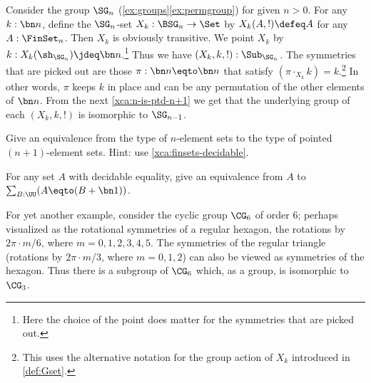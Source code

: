 \begin{example}
  \label{exa:fix1subSGn}%
Consider the group $\SG_n$ (\cref{ex:groups}\ref{ex:permgroup}) 
for given $n>0$. For any $k:\bn n$, define
the $\SG_n$-set $X_k : \BSG_n  \to\Set$ by $X_k(A,!)\defeq A$ for any
$A:\FinSet_n$. Then $X_k$ is obviously transitive. We point $X_k$ by
$k: X_k(\sh_{\SG_n}) \jdeq \bn n$.\footnote{Here the choice of the point
does matter for the symmetries that are picked out.}
Thus we have $(X_k,k,!):\Sub_{\SG_n}$.
The symmetries that are picked out are those $\pi : \bn n \eqto \bn n$
that satisfy $(\pi \cdot_{X_k}k) = k$.\footnote{%
This uses the alternative notation for the group action of $X_k$
introduced in \cref{def:Gset}.}
In other words, $\pi$ keeps $k$ in place and can be any permutation
of the other elements of $\bn n$. From the next \cref{xca:n-is-ptd-n+1}
we get that the underlying group of each $(X_k,k,!)$ 
is isomorphic to $\SG_{n-1}$.
\end{example}

\begin{xca} \label{xca:n-is-ptd-n+1}
Give an equivalence from the type of
$n$-element sets to the type of pointed $(n{+}1)$-element sets.
Hint: use \cref{xca:finsets-decidable}.
\end{xca}

\begin{xca} \label{xca:A-is-A-1+1}
  For any set $A$ with decidable equality,
  give an equivalence from $A$ to $\sum_{B:\UU}(A\eqto(B+\bn1))$.
\end{xca}

For yet another example, consider the cyclic group $\CG_6$ of order $6$; perhaps visualized as the rotational symmetries of a regular hexagon,  \ie the rotations by $2\pi\cdot m /6$, where $m=0,1,2,3,4,5$.
The symmetries of the regular triangle (rotations by $2\pi\cdot m/3$, where $m=0,1,2$) can also be viewed as symmetries of the hexagon.
Thus there is a subgroup of $\CG_6$ which, as a group, is isomorphic to $\CG_3$.

